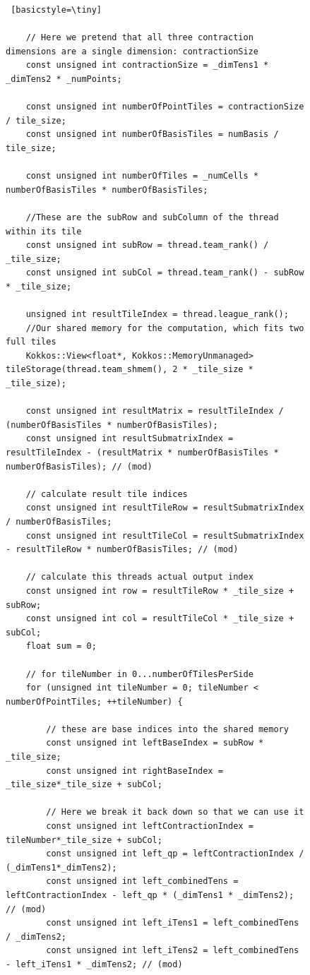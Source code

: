 \begin{figure}[H]
    \begin{lstlisting} [basicstyle=\tiny]

    // Here we pretend that all three contraction dimensions are a single dimension: contractionSize
    const unsigned int contractionSize = _dimTens1 * _dimTens2 * _numPoints;
    
    const unsigned int numberOfPointTiles = contractionSize / tile_size;
    const unsigned int numberOfBasisTiles = numBasis / tile_size;

    const unsigned int numberOfTiles = _numCells * numberOfBasisTiles * numberOfBasisTiles;
    
    //These are the subRow and subColumn of the thread within its tile
    const unsigned int subRow = thread.team_rank() / _tile_size;
    const unsigned int subCol = thread.team_rank() - subRow * _tile_size;

    unsigned int resultTileIndex = thread.league_rank();
    //Our shared memory for the computation, which fits two full tiles
    Kokkos::View<float*, Kokkos::MemoryUnmanaged> tileStorage(thread.team_shmem(), 2 * _tile_size * _tile_size);

    const unsigned int resultMatrix = resultTileIndex / (numberOfBasisTiles * numberOfBasisTiles);
    const unsigned int resultSubmatrixIndex = resultTileIndex - (resultMatrix * numberOfBasisTiles * numberOfBasisTiles); // (mod)

    // calculate result tile indices
    const unsigned int resultTileRow = resultSubmatrixIndex / numberOfBasisTiles;
    const unsigned int resultTileCol = resultSubmatrixIndex - resultTileRow * numberOfBasisTiles; // (mod)

    // calculate this threads actual output index
    const unsigned int row = resultTileRow * _tile_size + subRow;
    const unsigned int col = resultTileCol * _tile_size + subCol;
    float sum = 0;

    // for tileNumber in 0...numberOfTilesPerSide
    for (unsigned int tileNumber = 0; tileNumber < numberOfPointTiles; ++tileNumber) {

        // these are base indices into the shared memory
        const unsigned int leftBaseIndex = subRow * _tile_size;
        const unsigned int rightBaseIndex = _tile_size*_tile_size + subCol;

        // Here we break it back down so that we can use it
        const unsigned int leftContractionIndex = tileNumber*_tile_size + subCol;
        const unsigned int left_qp = leftContractionIndex / (_dimTens1*_dimTens2);
        const unsigned int left_combinedTens = leftContractionIndex - left_qp * (_dimTens1 * _dimTens2); // (mod)
        const unsigned int left_iTens1 = left_combinedTens / _dimTens2;
        const unsigned int left_iTens2 = left_combinedTens - left_iTens1 * _dimTens2; // (mod)


\end{lstlisting}
\end{figure}
